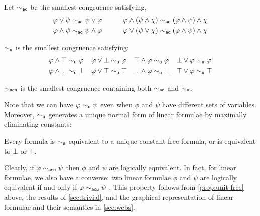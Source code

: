 \documentclass[a4paper, UKenglish, cleveref]{lipics-v2019}
\begin{document}
\begin{definition}
Let \(\sim_{\mathsf{ac}}\) be the smallest congruence satisfying,
\begin{alignat*}{2}
  &\varphi \lor \psi \sim_{\mathsf{ac}} \psi \lor \varphi &\quad\quad&\varphi \land (\psi \land \chi) \sim_{\mathsf{ac}} (\varphi \land \psi) \land \chi\\
  &\varphi \land \psi \sim_{\mathsf{ac}} \psi \land \varphi &&\varphi \lor (\psi \lor \chi) \sim_{\mathsf{ac}} (\varphi \land \psi) \land \chi
\end{alignat*}

$\sim_{\mathsf{u}}$ is the smallest congruence satisfying:
\begin{equation}
  \label{eq:un-eq-rel}
  \begin{alignedat}{4}
    &\varphi \land \top \sim_{\mathsf{u}} \varphi   &\quad& \varphi \lor \bot\sim_{\mathsf{u}} \varphi &\quad&
    \top \land \varphi \sim_{\mathsf{u}}  \varphi  &\quad&  \bot \lor \varphi \sim_{\mathsf{u}} \varphi  \\
    &\varphi \land \bot \sim_{\mathsf{u}} \bot  && \varphi \lor \top \sim_{\mathsf{u}} \top  &&
    \bot \land \varphi \sim_{\mathsf{u}} \bot  && \top \lor \varphi \sim_{\mathsf{u}} \top
  \end{alignedat}
\end{equation}

\(\sim_{\mathsf{acu}}\) is the smallest congruence containing both $\sim_{\mathsf{ac}}$ and $\sim_{\mathsf{u}}$.
\end{definition}
Note that we can have \(\varphi \sim_{\mathsf{u}} \psi\) even when \(\phi\) and \(\psi\) have different sets of variables.
Moreover, $\sim_{\mathsf{u}}$ generates a unique normal form of linear formulae by maximally eliminating constants:

\begin{proposition}
  \label{prop:unit-free}
  Every formula is $\sim_{\mathsf{u}}$-equivalent to a unique constant-free formula, or is equivalent to $\bot$ or $\top$.
\end{proposition}

\begin{remark}
\label{acu-and-logical-equivalence}
Clearly, if $\varphi \sim_{\mathsf{acu}} \psi$ then $\phi$ and $\psi$ are logically equivalent.
In fact, for linear formulae, we also have a converse: two linear formulae $\phi$ and $\psi$ are logically equivalent if and only if $\varphi \sim_{\mathsf{acu}} \psi$ \cite{DasStr15:no-comp-lin-sys,DasStr16:no-compl-lin-sys}.
This property follows from \cref{prop:unit-free} above, the results of \cref{sec:trivial}, and the graphical representation of linear formulae and their semantics in \cref{sec:webs}.
\end{remark}
\end{document}
